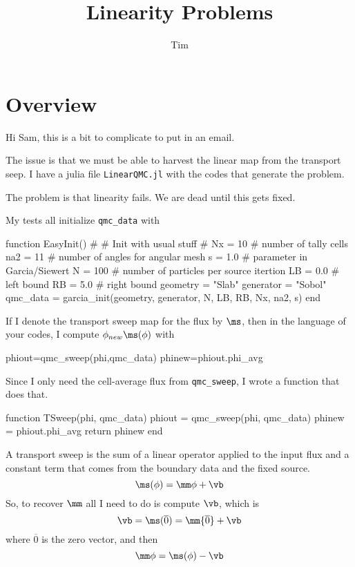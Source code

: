 \documentclass[12pt]{siamltex}
\title{Linearity Problems}
\author{Tim}
\begin{document}
\maketitle

\section{Overview}

Hi Sam, this is a bit to complicate to put in an email.

The issue is that we must be able to harvest the linear map from
the transport seep. I have a julia file {\tt LinearQMC.jl} with
the codes that generate the problem.

The problem is that linearity fails. We are dead until this gets fixed.

My tests all initialize {\tt qmc\_data} with 

\begin{code}
function EasyInit()
    #
    # Init with usual stuff
    #
    Nx = 10     # number of tally cells
    na2 = 11    # number of angles for angular mesh
    s = 1.0     # parameter in Garcia/Siewert
    N = 100    # number of particles per source itertion
    LB = 0.0   # left bound
    RB = 5.0   # right bound
    geometry = "Slab"
    generator = "Sobol"
    qmc_data = garcia_init(geometry, generator, N, LB, RB,
                            Nx, na2, s)
end
\end{code}



If I denote the transport sweep map for the flux by $\ms$, then in the 
language of your codes, I compute $\phi_{new} \ms(\phi)$ with

\begin{code}
phiout=qmc_sweep(phi,qmc_data)
phinew=phiout.phi_avg
\end{code}

Since I only need the cell-average flux from {\tt qmc\_sweep}, I wrote
a function that does that.

\begin{code}
function TSweep(phi, qmc_data)
    phiout = qmc_sweep(phi, qmc_data)
    phinew = phiout.phi_avg
    return phinew
end
\end{code}

A transport sweep is the sum of a linear operator applied to the input
flux and a constant term that comes from the boundary data and the fixed source.
\[
\ms(\phi) = \mm \phi + \vb
\]
So, to recover $\mm$ all I need to do is compute $\vb$, which is
\[
\vb = \ms({\overline 0}) = \mm {\overline 0} + \vb 
\]
where ${\overline 0}$ is the zero vector, and then
\[
\mm \phi = \ms(\phi) - \vb
\]
\end{document}
